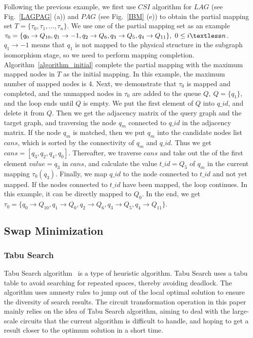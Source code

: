 \documentclass[runningheads]{llncs}
\begin{document}
	\begin{example}
		Following the previous example, 
we first use  $CSI$ algorithm for $LAG$
(see Fig.~\ref{LAGPAG} (a)) and $PAG$ (see Fig.~\ref{IBM} (e)) 
to obtain the partial mapping set $T=\{\tau_{0},\tau_{1},...,\tau_{n}\}$.
We use one of the partial mapping set as an example
$\tau_{0}=\{q_{0}\rightarrow Q_{10},q_{1}\rightarrow -1,
	q_{2}\rightarrow Q_{6},q_{3}\rightarrow Q_{5},q_{4}\rightarrow Q_{11}\}, \ 0 \le i \textless n$. 
	$q_{1}\rightarrow -1$ means that $q_{1}$ is not mapped to the physical structure in the subgraph isomorphism stage,
	so we need to perform mapping completion. 
	Algorithm~\ref{algorithm_initial} 
	complete the partial mapping with the maximum mapped nodes in $T$ as the initial mapping.
	In this example, the maximum number of mapped nodes is 4. 
	Next, we demonstrate that $\tau_{0}$ is mapped and completed, 
	and the unmapped nodes in $\tau_{0}$ are added to the queue $Q, \ Q=\{q_{1}\}$, 
	and the loop ends until $Q$ is empty. 
	We put the first element of $Q$ into $q\_id$, and delete it from $Q$.  
	Then we get the adjacency matrix of the query graph and the target graph,
	and traversing the node $q_{m}$ connected to $q\_id$ in the adjacency matrix. 
	If the node $q_{m}$ is matched, then we put $q_{m}$ into the candidate nodes list $cans$,
	which is sorted by the connectivity of $q_{m}$ and $q\_id$.
	Thus we get $cans=[q_{3},q_{2},q_{4},q_{0}]$.
	Thereafter, we traverse $cans$ and take out the of the first element $value=q_{3}$ in $cans$, 
	and calculate the value $t\_id=Q_{5}$ of $q_{m}$ in the current mapping $\tau_{0}(q_{3})$.
	 Finally, we map $q\_id$ to the node connected to $t\_id$ and not yet mapped. 
	 If the nodes connected to $t\_id$ have been mapped, 
	 the loop continues. In this example, it can be directly mapped to $Q_{0}$. In the end, we get 
	 $ \tau_{0}=\{q_{0}\rightarrow  Q_{10},q_{1}\rightarrow Q_{0},
	q_{2}\rightarrow  Q_{6},q_{3}\rightarrow  Q_{5},q_{4}\rightarrow  Q_{11}\}$.
	\end{example}
\subsection{Swap Minimization}
\subsubsection{Tabu Search}
Tabu Search algorithm~\cite{Glover1990} is a type of heuristic algorithm. 
Tabu Search uses a tabu table to avoid searching for repeated spaces, 
thereby avoiding deadlock. 
The algorithm uses amnesty rules to jump out of the local optimal solution 
to ensure the diversity of search results.
The circuit transformation operation in this paper mainly relies on 
the idea of Tabu Search algorithm, 
aiming to deal with the large-scale circuits that the current algorithm is difficult to handle, 
and hoping to get a result closer to the optimum solution in a short time.
\end{document}

